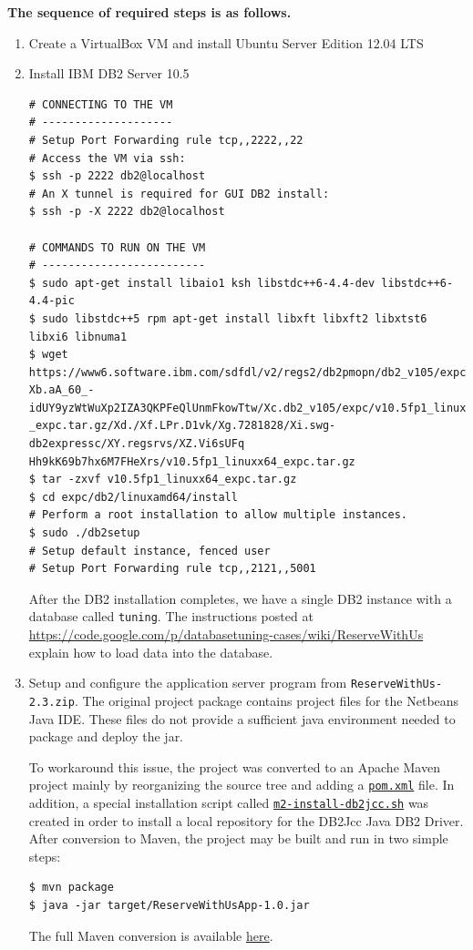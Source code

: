 \documentclass[letterpaper]{article}%
\begin{document}
\textbf{The sequence of required steps is as follows.}
\begin{enumerate}
  \item Create a VirtualBox VM and install Ubuntu Server Edition 12.04 LTS

  \item Install IBM DB2 Server 10.5
    \begin{Verbatim}[frame=single]
# CONNECTING TO THE VM
# --------------------
# Setup Port Forwarding rule tcp,,2222,,22
# Access the VM via ssh:
$ ssh -p 2222 db2@localhost
# An X tunnel is required for GUI DB2 install:
$ ssh -p -X 2222 db2@localhost

# COMMANDS TO RUN ON THE VM
# -------------------------
$ sudo apt-get install libaio1 ksh libstdc++6-4.4-dev libstdc++6-4.4-pic
$ sudo libstdc++5 rpm apt-get install libxft libxft2 libxtst6 libxi6 libnuma1
$ wget https://www6.software.ibm.com/sdfdl/v2/regs2/db2pmopn/db2_v105/expc/Xa.2/
Xb.aA_60_-idUY9yzWtWuXp2IZA3QKPFeQlUnmFkowTtw/Xc.db2_v105/expc/v10.5fp1_linuxx64
_expc.tar.gz/Xd./Xf.LPr.D1vk/Xg.7281828/Xi.swg-db2expressc/XY.regsrvs/XZ.Vi6sUFq
Hh9kK69b7hx6M7FHeXrs/v10.5fp1_linuxx64_expc.tar.gz
$ tar -zxvf v10.5fp1_linuxx64_expc.tar.gz
$ cd expc/db2/linuxamd64/install
# Perform a root installation to allow multiple instances.
$ sudo ./db2setup
# Setup default instance, fenced user
# Setup Port Forwarding rule tcp,,2121,,5001
    \end{Verbatim}

    After the DB2 installation completes, we have a single DB2 instance with a
    database called \texttt{tuning}. The instructions posted at
    \url{https://code.google.com/p/databasetuning-cases/wiki/ReserveWithUs}
    explain how to load data into the database.

  \item Setup and configure the application server program from
    \texttt{ReserveWithUs-2.3.zip}. The original project package contains
    project files for the Netbeans Java IDE. These files do not provide a
    sufficient java environment needed to package and deploy the \RWUApp{} jar.

    To workaround this issue, the \RWUApp{} project was converted to an Apache
    Maven project mainly by reorganizing the source tree and adding a
    \href{%
      https://github.com/blr246/adbs-reservewithus/blob/master/ReserveWithUsApp/pom.xml%
    }{\texttt{pom.xml}}
    file. In addition, a special installation script called
    \href{%
      https://github.com/blr246/adbs-reservewithus/blob/master/ReserveWithUsApp/m2-install-db2jcc.sh%
    }{\texttt{m2-install-db2jcc.sh}} was created in order to install a local
    repository for the DB2Jcc Java DB2 Driver. After conversion to Maven, the
    project may be built and run in two simple steps:
    \begin{Verbatim}[frame=lines]
$ mvn package
$ java -jar target/ReserveWithUsApp-1.0.jar
    \end{Verbatim}

    The full Maven conversion is available
    \href{%
      https://github.com/blr246/adbs-reservewithus/commit/%
      fd68b867a8dd5a7cb88058cf4a24ca59dd8575eb%
    }{here}.
\end{enumerate}
\end{document}
